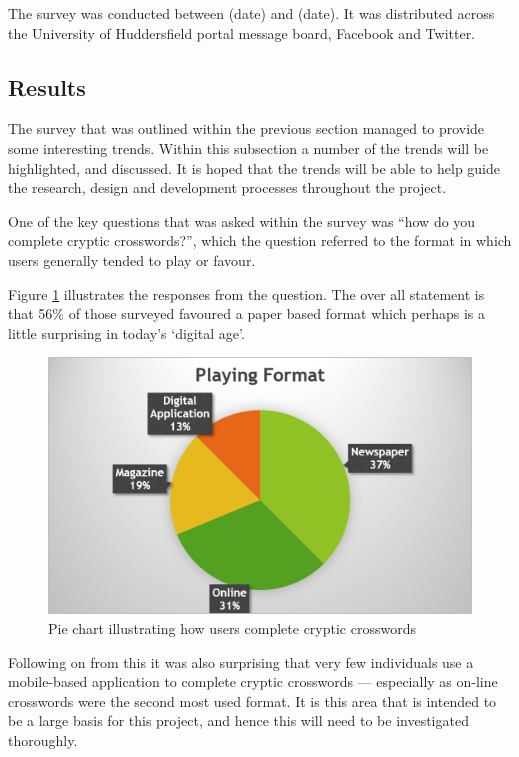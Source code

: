 The survey was conducted between (date) and (date). It was distributed across
the University of Huddersfield portal message board, Facebook and Twitter.


\subsection{Results}

The survey that was outlined within the previous section managed to provide some
interesting trends. Within this subsection a number of the trends will be 
highlighted, and discussed. It is hoped that the trends will be able to help 
guide the research, design and development processes throughout the project.

One of the key questions that was asked within the survey was ``how do you 
complete cryptic crosswords?'', which the question referred to the format in 
which users generally tended to play or favour. 

Figure \ref{fig:playing_format} illustrates the responses from the question. The
over all statement is that 56\% of those surveyed favoured a paper based format
which perhaps is a little surprising in today's `digital age'.

\begin{figure}[H]
  \centering
  \includegraphics[scale=0.9]{graphs/playing_format.png}
  \caption{Pie chart illustrating how users complete cryptic crosswords}
  \label{fig:playing_format}
\end{figure}

Following on from this it was also surprising that very few individuals use a 
mobile-based application to complete cryptic crosswords --- especially as 
on-line crosswords were the second most used format. It is this area that is
intended to be a large basis for this project, and hence this will need to be
investigated thoroughly.

